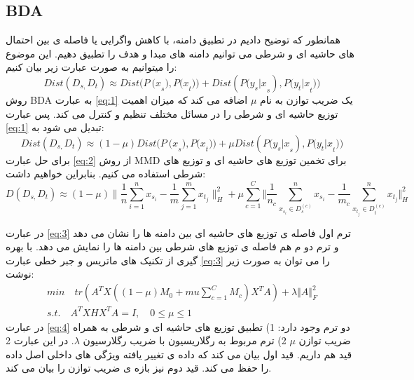 {{ 	\subsection{BDA}
 	{
 		همانطور که توضیح دادیم در تطبیق دامنه، با کاهش واگرایی یا فاصله ی بین احتمال های حاشیه ای و شرطی می توانیم دامنه های مبدا و هدف را تطبیق دهیم. این موضوع را میتوانیم به صورت عبارت زیر بیان کنیم:
 		\begin{equation}
 			Dist\left(D_{s,}D_t\right)\approx Dist{(P\ (x}_s),{P(x}_t))+Dist({P(y_s|x}_s),{P(y_t|x}_t))
 			\label{eq:1}
 		\end{equation}
 		روش BDA به عبارت 
 		\ref{eq:1}
 		 یک ضریب توازن به نام $\mu$ اضافه می کند که میزان اهمیت توزیع حاشیه ای و شرطی را در مسائل مختلف تنظیم و کنترل می کند. پس عبارت 
 		 \ref{eq:1}
 		 تبدیل می شود به:
 		 \begin{equation}
 			Dist\left(D_{s,}D_t\right)\approx(1-\mu)Dist{(P\ (x}_s),{P(x}_t))+\mu Dist({P(y_s|x}_s),{P(y_t|x}_t))
 			\label{eq:2}
 		 \end{equation}
 		  برای حل عبارت 
 		  \ref{eq:2}
 		  از روش MMD برای تخمین توزیع های حاشیه ای و توزیع های شرطی استفاده می کنیم. بنابراین خواهیم داشت:
 		  \begin{equation}
 		  	 D \left( D_{s,}D_{t} \right)  \approx  \left( 1- \mu  \right)  \bigg \|\frac{1}{n} \sum _{i=1}^{n}x_{s_{i}} - \frac{1}{m} \sum _{j=1}^{m}x_{t_{j}}\bigg \| _{H}^{2} + \mu \sum _{c=1}^{C} \bigg \Vert \frac{1}{n_{c}} \sum _{x_{s_{i}} \in  D_{s}^{ \left( c \right) }}^{n}x_{s_{i}} - \frac{1}{m_{c}} \sum _{x_{t_{j}} \in  D_{t}^{ \left( c \right) }}^{n}x_{t_{j}} \bigg \Vert _{H}^{2}
 		  	 \label{eq:3}
 		  \end{equation}
 		  
 		  در عبارت 
 		 \ref{eq:3}
 		  ترم اول فاصله ی توزیع های حاشیه ای بین دامنه ها را نشان می دهد و ترم دو م هم  فاصله ی توزیع های شرطی بین دامنه ها را نمایش می دهد. با بهره گیری از تکنیک های ماتریس و جبر خطی عبارت 
 		 \ref{eq:3}
 		  را می توان به صورت زیر نوشت:
 		  \begin{equation}
	 	  \begin{aligned}
		  min \quad tr \left( A^{T}X \left( \left( 1 - \mu \right) M_{0} + mu \sum _{c=1\mathrm{ }}^{C}M_{c} \right) X^{T}A \right) + \lambda \Vert A \Vert_{F}^{2} \\
		  s.t. \quad A^{T}XHX^{T}A = I, \quad  0  \leq \mu \leq  1 \quad \quad \quad \quad \quad
		  \label{eq:4}
	 	  \end{aligned}
 		  \end{equation}
 		   در عبارت
 		   \ref{eq:4}
 		    دو ترم وجود دارد: 1) تطبیق توزیع های حاشیه ای و شرطی به همراه ضریب توازن $\mu$ 2) ترم مربوط به رگلاریسیون با ضریب رگلارسیون $\lambda$. در این عبارت 2 قید هم داریم. قید اول بیان می کند که داده ی تغییر یافته ویژگی های داخلی اصل داده را حفظ می کند. قید دوم نیز بازه ی ضریب توازن را بیان می کند.
 		    
}}}

